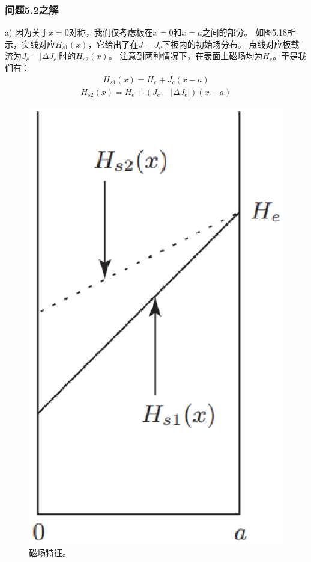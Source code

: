 \subsubsection{问题5.2之解}
a) 因为关于$x=0$对称，我们仅考虑板在$x=0$和$x=a$之间的部分。
如图5.18所示，实线对应$H_{s1}(x)$，它给出了在$J=J_c$下板内的初始场分布。
点线对应板载流为$J_c-|\Delta J_c|$时的$H_{s2}(x)$。
注意到两种情况下，在表面上磁场均为$H_e$。于是我们有：
\begin{align*}%
H_{s1}(x)=H_{e}+J_{c}(x-a)\tag{S2.1a}
\end{align*}
\begin{align*}%
H_{s2}(x)=H_{e}+(J_{c}-| \Delta J_{c}|)(x-a)\tag{S2.1b}
\end{align*}
\begin{figure}[htbp]
	\centering
	\includegraphics[scale=0.5]{chpt5/figs/fig5.18.eps}
	\caption{磁场特征。}
\end{figure}

